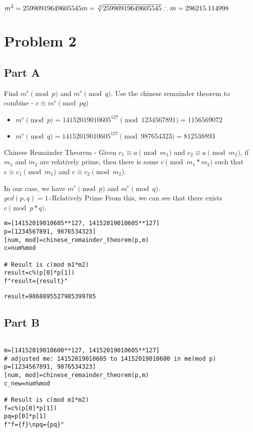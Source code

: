 \documentclass[11pt]{article}
\begin{document}
\(\\m^3=25990919649605545\\m=\sqrt[3]{25990919649605545}\\\therefore m=296215.114998\)

\section{Problem 2}
\label{sec:orgfb1e94c}

\subsection{Part A}
\label{sec:org2520b84}
Find \(m^e\pmod{p}\) and \(m^e\pmod{q}\).
Use the chinese remainder theorem to combine - \(c\equiv m^e\pmod{pq}\)
\begin{itemize}
\item \(m^e\pmod{p}=14152019010605^{127}\pmod{1234567891}=1156569072\)
\item \(m^e\pmod{q}=14152019010605^{127}\pmod{987654323}=812538893\)
\end{itemize}


Chinese Remainder Theorem - Given \(c_1\equiv a\pmod{m_1}\) and \(c_2\equiv a\pmod{m_2}\), if \(m_1\) and \(m_2\) are relatively prime, then there is some \(c\pmod{m_1*m_2}\) such that \(c\equiv c_1\pmod{m_1}\) and \(c\equiv c_2\pmod{m_2}\).


In our case, we have \(m^e\pmod{p}\) and \(m^e\pmod{q}\).
\(gcd(p,q)=1\therefore\text{Relatively Prime}\)
From this, we can see that there exists \(c\pmod{p*q}\).
\begin{verbatim}
m=[14152019010605**127, 14152019010605**127]
p=[1234567891, 9876534323]
[num, mod]=chinese_remainder_theorem(p,m)
c=num%mod

# Result is c(mod m1*m2)
result=c%(p[0]*p[1])
f"result={result}"

\end{verbatim}

\begin{verbatim}
result=9868895527985399785
\end{verbatim}

\subsection{Part B}
\label{sec:orgdc8d35b}


\begin{verbatim}

m=[14152019010600**127, 14152019010605**127]
# adjusted me: 14152019010605 to 14152019010600 in me(mod p)
p=[1234567891, 9876534323]
[num, mod]=chinese_remainder_theorem(p,m)
c_new=num%mod

# Result is c(mod m1*m2)
f=c%(p[0]*p[1])
pq=p[0]*p[1]
f"f={f}\npq={pq}"

\end{verbatim}
\end{document}
